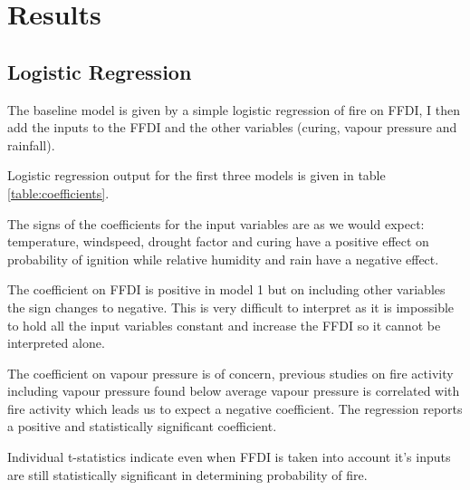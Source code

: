 \documentclass[11pt,a4paper]{article}
\begin{document}


\section{Results}

\subsection{Logistic Regression}

The baseline model is given by a simple logistic regression of fire on FFDI, I then add the inputs to the FFDI and  the other variables (curing, vapour pressure and rainfall). 

Logistic regression output for the first three models is given in table \ref{table:coefficients}. 

The signs of the coefficients for the input variables are as we would expect: temperature, windspeed, drought factor and curing have a positive effect on probability of ignition while relative humidity and rain have a negative effect. 


The coefficient on FFDI is positive in model 1 but on including other variables the  sign changes to negative. This is very difficult to interpret as it is impossible to hold all the input  variables constant and increase the FFDI so it cannot be interpreted alone. 

The coefficient on vapour pressure is of concern, previous studies on fire activity including vapour pressure \citep{harris14} found below average vapour pressure is correlated with fire activity which leads us to expect a negative coefficient. The regression reports a positive and statistically significant coefficient. 

Individual t-statistics indicate even when FFDI is taken into account it's inputs are still statistically significant in determining probability of fire. 
\end{document}
